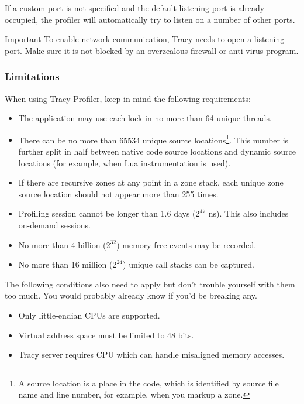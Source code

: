 \documentclass[hidelinks,titlepage,a4paper,twoside]{article}
\begin{document}
If a custom port is not specified and the default listening port is already occupied, the profiler will automatically try to listen on a number of other ports.

\begin{bclogo}[
noborder=true,
couleur=black!5,
logo=\bcbombe
]{Important}
To enable network communication, Tracy needs to open a listening port. Make sure it is not blocked by an overzealous firewall or anti-virus program.
\end{bclogo}

\subsubsection{Limitations}

When using Tracy Profiler, keep in mind the following requirements:

\begin{itemize}
\item The application may use each lock in no more than 64 unique threads.
\item There can be no more than 65534 unique source locations\footnote{A source location is a place in the code, which is identified by source file name and line number, for example, when you markup a zone.}. This number is further split in half between native code source locations and dynamic source locations (for example, when Lua instrumentation is used).
\item If there are recursive zones at any point in a zone stack, each unique zone source location should not appear more than 255 times.
\item Profiling session cannot be longer than 1.6 days ($2^{47}$ \si{\nano\second}). This also includes on-demand sessions.
\item No more than 4 billion ($2^{32}$) memory free events may be recorded.
\item No more than 16 million ($2^{24}$) unique call stacks can be captured.
\end{itemize}

The following conditions also need to apply but don't trouble yourself with them too much. You would probably already know if you'd be breaking any.

\begin{itemize}
\item Only little-endian CPUs are supported.
\item Virtual address space must be limited to 48 bits.
\item Tracy server requires CPU which can handle misaligned memory accesses.
\end{itemize}
\end{document}
